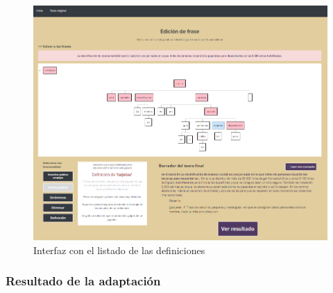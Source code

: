 \begin{itemize}
\begin{figure}[h!]
	
	\includegraphics[scale=0.55]{Imagenes/Figuras/definiciones}
	
	
	\caption{Interfaz con el listado de las definiciones}
	\label{fig:definiciones}
\end{figure}
\end{itemize}

   
   
   
%   	
%   	
%   	
%   	



\subsubsection{Resultado de la adaptación}

